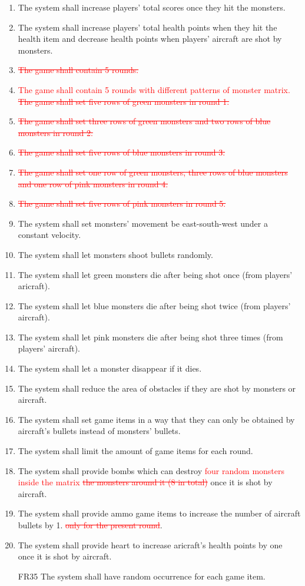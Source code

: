 \documentclass[12pt]{article}
\begin{document}
\begin{enumerate}[{FR}1:]
\item The system shall increase players’ total scores once they hit the monsters.
\item The system shall increase players’ total health points when they hit the health item and decrease health points when players’ aircraft are shot by monsters.
\item \textcolor{red}{\sout{The game shall contain 5 rounds.}}
\item \textcolor{red}{The game shall contain 5 rounds with different patterns of monster matrix. \sout{The game shall set five rows of green monsters in round 1.} }
\item \textcolor{red}{\sout{The game shall set three rows of green monsters and two rows of blue monsters in round 2.}}
\item \textcolor{red}{\sout{The game shall set five rows of blue monsters in round 3.}}
\item \textcolor{red}{\sout{The game shall set one row of green monsters, three rows of blue monsters and one row of pink monsters in round 4.}} 
\item \textcolor{red}{\sout{The game shall set five rows of pink monsters in round 5.}}
\item The system shall set monsters’ movement be east-south-west under a constant velocity.
\item The system shall let monsters shoot bullets randomly.
\item The system shall let green monsters die after being shot once (from players’ aricraft).
\item The system shall let blue monsters die after being shot twice (from players’ aircraft).
\item The system shall let pink monsters die after being shot three times (from players’ aircraft).
\item The system shall let a monster disappear if it dies.
\item The system shall reduce the area of obstacles if they are shot by monsters or aircraft.
\item The system shall set game items in a way that they can only be obtained by aircraft’s bullets instead of monsters’ bullets.
\item The system shall limit the amount of game items for each round.
\item The system shall provide bombs which can destroy \textcolor{red}{four random monsters inside the matrix \sout{the monsters around it (8 in total)}} once it is shot by aircraft.
\item The system shall provide ammo game items to increase the number of aircraft bullets by 1.\textcolor{red}{\sout{ only for the present round}}. 
\item The system shall provide heart to increase aricraft's health points by one once it is shot by aircraft.
\item[FR35] The system shall have random occurrence for each game item.
\end{enumerate}
\end{document}
